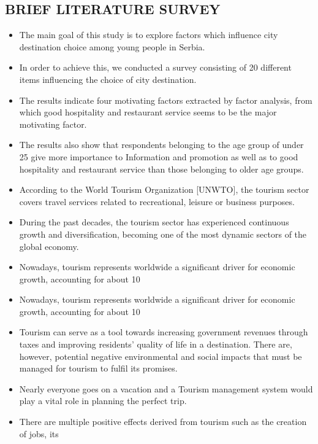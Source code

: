\documentclass[12pt,a4paper]{article}
\begin{document}
	\subsection*{\protect \centering BRIEF LITERATURE SURVEY}
	\pagestyle{fancy}
	\pagestyle{myPageStyle}
	
	\begin{itemize}
		\item The main goal of this study is to explore factors which influence city destination choice
		among young people in Serbia.
		\item In order to achieve this, we conducted a survey consisting of 20 different items
		influencing the choice of city destination.
		\item The results indicate four motivating factors extracted by factor analysis, from which
		good hospitality and restaurant service seems to be the major motivating factor.
		\item The results also show that respondents belonging to the age group of under 25 give
		more importance to Information and promotion as well as to good hospitality and
		restaurant service than those belonging to older age groups.
		\item According to the World Tourism Organization [UNWTO], the tourism sector covers
		travel services related to recreational, leisure or business purposes.
		\item During the past decades, the tourism sector has experienced continuous growth and
		diversification, becoming one of the most dynamic sectors of the global economy.
		\item Nowadays, tourism represents worldwide a significant driver for economic growth,
		accounting for about 10%
		\item Nowadays, tourism represents worldwide a significant driver for economic growth,
		accounting for about 10%
		\item Tourism can serve as a tool towards increasing government revenues through taxes and
		improving residents’ quality of life in a destination. There are, however, potential
		negative environmental and social impacts that must be managed for tourism to fulfil
		its promises.
		\item Nearly everyone goes on a vacation and a Tourism management system would play a
		vital role in planning the perfect trip.
		\item There are multiple positive effects derived from tourism such as the creation of jobs, its

\end{itemize}
\end{document}
